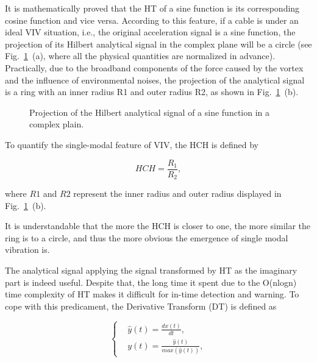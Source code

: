 \documentclass[preprint, 3p, times, compress, 11pt]{elsarticle}
\begin{document}
It is mathematically proved that the HT of a sine function is its 
corresponding cosine function and vice versa. According to this feature, 
if a cable is under an ideal VIV situation, i.e., the original acceleration 
signal is a sine function, the projection of its Hilbert analytical 
signal in the complex plane will be a circle (see Fig.~\ref{fig:proj_hilb}~(a), 
where all the physical quantities are normalized in advance). Practically, 
due to the broadband components of the force caused by the vortex and the 
influence of environmental noises, the projection of the analytical 
signal is a ring with an inner radius R1 and outer radius R2, as shown 
in Fig.~\ref{fig:proj_hilb}~(b).

\begin{figure}[ht]
    \centering
    \qquad
    \caption{Projection of the Hilbert analytical signal of a sine 
            function in a complex plain.}
    \label{fig:proj_hilb}
\end{figure}

To quantify the single-modal feature of VIV, the HCH is defined by 

\begin{equation}
    HCH = \frac{R_1}{R_2},
    \label{eq:HCH}
\end{equation}

where $R1$ and $R2$ represent the inner radius and outer radius 
displayed in Fig.~\ref{fig:proj_hilb}~(b).

It is understandable that the more the HCH is closer to one, the more 
similar the ring is to a circle, and thus the more obvious the emergence 
of single modal vibration is. 


The analytical signal applying the signal transformed by HT as the 
imaginary part is indeed useful. Despite that, the long time it spent 
due to the O(nlogn) time complexity of HT makes it difficult for in-time 
detection and warning. To cope with this predicament, the Derivative 
Transform (DT) is defined as 

\begin{equation}
    \left \{
        \begin{aligned} 
            &\hat{y}(t) = \frac{dx(t)}{dt}, \\ 
            &y(t) = \frac{\hat{y}(t)}{max \left( \hat{y}(t) \right)},
        \end{aligned} 
    \right. 
    \label{eq:deri}
\end{equation}
\end{document}
